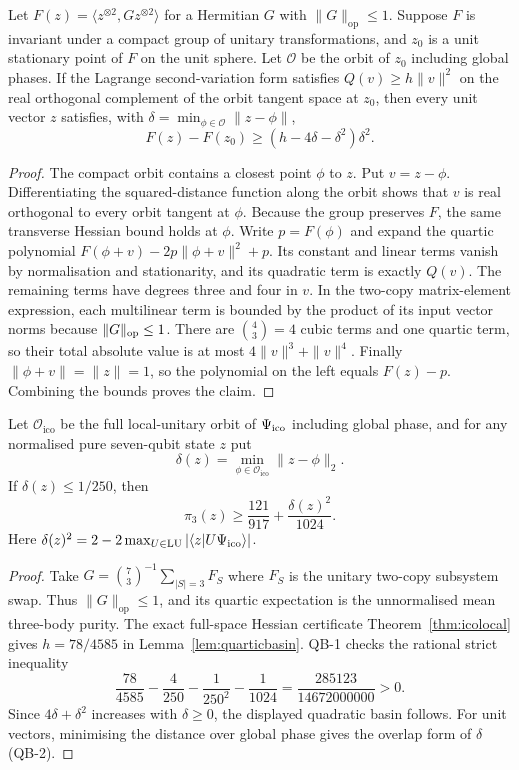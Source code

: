 \begin{lemma}
\label{lem:quarticbasin}
Let $F(z)=\langle z^{\otimes2},Gz^{\otimes2}\rangle$ for a
Hermitian $G$ with $\|G\|_{\mathrm{op}}\le1$. Suppose $F$ is invariant
under a compact group of unitary transformations, and $z_0$ is a
unit stationary point of $F$ on the unit sphere. Let
$\mathcal O$ be the orbit of $z_0$ including global phases.
If the Lagrange second-variation form satisfies
$Q(v)\ge h\|v\|^2$ on the real orthogonal complement of the
orbit tangent space at $z_0$, then every unit vector $z$
satisfies, with $\delta=\min_{\phi\in\mathcal O}\|z-\phi\|$,
\[
             F(z)-F(z_0)\ge(h-4\delta-\delta^2)\delta^2.
\]
\end{lemma}
\begin{proof}
The compact orbit contains a closest point $\phi$ to $z$.
Put $v=z-\phi$. Differentiating the squared-distance
function along the orbit shows that $v$ is real orthogonal to
every orbit tangent at $\phi$. Because the group preserves
$F$, the same transverse Hessian bound holds at $\phi$.
Write $p=F(\phi)$ and expand the quartic polynomial
$F(\phi+v)-2p\|\phi+v\|^2+p$. Its constant and linear
terms vanish by normalisation and stationarity, and its
quadratic term is exactly $Q(v)$. The remaining terms have
degrees three and four in $v$. In the two-copy matrix-element
expression, each multilinear term is bounded by the product
of its input vector norms because $\|G\|_{\rm op}\le1$.
There are $\binom43=4$ cubic terms and one quartic term, so
their total absolute value is at most
$4\|v\|^3+\|v\|^4$.
Finally $\|\phi+v\|=\|z\|=1$, so the polynomial on the
left equals $F(z)-p$. Combining the bounds proves the claim.
\end{proof}

\begin{theorem}
\label{thm:icoquantbasin}
Let $\mathcal O_{\mathrm{ico}}$ be the full local-unitary orbit
of $\Psi_{\mathrm{ico}}$ including global phase, and for any normalised pure
seven-qubit state $z$ put
\[
 \delta(z)=\min_{\phi\in\mathcal O_{\mathrm{ico}}}\|z-\phi\|_2.
\]
If $\delta(z)\le1/250$, then
\[
 \boxed{\quad \pi_3(z)\ge\frac{121}{917}
             +\frac{\delta(z)^2}{1024}.\quad}
\]
Here $\delta(z)^2=2-2\max_{U\in\mathrm{LU}}|\langle z|U\Psi_{\mathrm{ico}}\rangle|$.
\end{theorem}
\begin{proof}
Take $G=\binom73^{-1}\sum_{|S|=3}F_S$ where $F_S$
is the unitary two-copy subsystem swap. Thus
$\|G\|_{\mathrm{op}}\le1$, and its quartic expectation
is the unnormalised mean three-body purity.
The exact full-space Hessian certificate
Theorem~\ref{thm:icolocal} gives $h=78/4585$ in
Lemma~\ref{lem:quarticbasin}. QB-1 checks the rational
strict inequality
\[
 \frac{78}{4585}-\frac4{250}-\frac1{250^2}
  -\frac1{1024}=\frac{285123}{14672000000}>0.
\]
Since $4\delta+\delta^2$ increases with $\delta\ge0$,
the displayed quadratic basin follows. For unit vectors,
minimising the distance over global phase gives the overlap form of $\delta$ (QB-2).
\end{proof}
